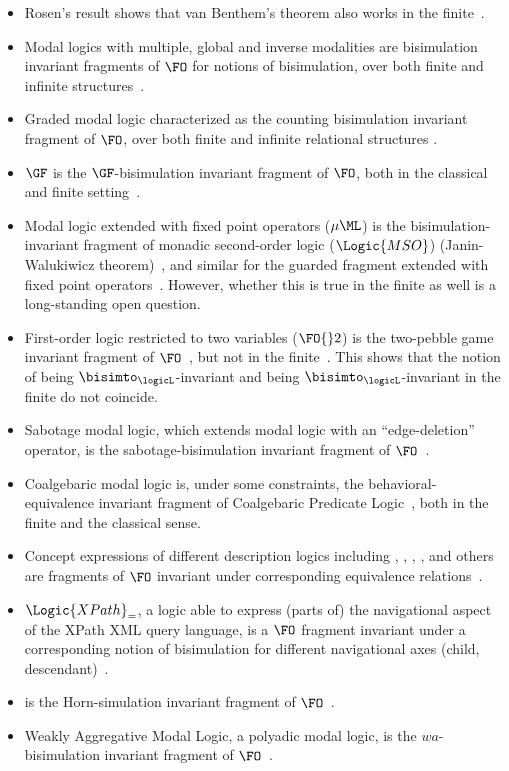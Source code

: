 \begin{itemize}
  \item Rosen's result shows that van Benthem's theorem also works in the finite~\cite{Rosen97}.
  \item Modal logics with multiple, global and inverse modalities are bisimulation invariant fragments of $\FO$ for notions of bisimulation, over both finite and infinite structures~\cite{Otto04}.
  \item Graded modal logic characterized as the counting bisimulation invariant fragment of $\FO$, over both finite and infinite relational structures \cite{derijke2000,otto2023}.
  \item $\GF$ is the $\GF$-bisimulation invariant fragment of $\FO$, both in the classical~\cite{AndrekaNB98} and finite setting~\cite{Otto2012}.
  \item Modal logic extended with fixed point operators ($\mu\ML$) is the bisimulation-invariant fragment of monadic second-order logic ($\Logic{MSO}$) (Janin-Walukiwicz theorem)~\cite{janin1996}, and similar for the guarded fragment extended with fixed point operators~\cite{gradel2002}.
        However, whether this is true in the finite as well is a long-standing open question.
  \item First-order logic restricted to two variables ($\FO{}2$) is the two-pebble game invariant fragment of $\FO$~\cite{gradel1999}, but not in the finite~\cite{otto2017}.
        This shows that the notion of being $\bisimto_{\logicL}$-invariant and being $\bisimto_{\logicL}$-invariant in the finite do not coincide.
  \item Sabotage modal logic, which extends modal logic with an ``edge-deletion'' operator, is the sabotage-bisimulation invariant fragment of $\FO$~\cite{aucher2015}.
  \item Coalgebaric modal logic is, under some constraints, the behavioral-equivalence invariant fragment of Coalgebaric Predicate Logic~\cite{litak2012}, both in the finite and the classical sense.
  \item Concept expressions of different description logics including , , , ,  and others are fragments of $\FO$ invariant under corresponding equivalence relations~\cite{kurtonina1999, lutz2011, piro2013}.
  \item $\Logic{XPath}_{=}$, a logic able to express (parts of) the navigational aspect of the XPath XML query language, is a $\FO$ fragment invariant under a corresponding notion of bisimulation for different navigational axes (child, descendant)~\cite{figueira2015}.
  \item {} is the Horn-simulation invariant fragment of $\FO$~\cite{jung2019}.
  \item Weakly Aggregative Modal Logic, a polyadic modal logic, is the $wa$-bisimulation invariant fragment of $\FO$~\cite{liu2019}.
\end{itemize}
